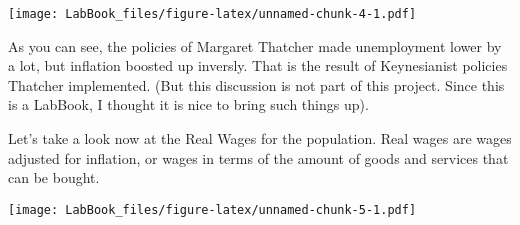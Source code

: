 \documentclass[]{article}
\newenvironment{Shaded}{\begin{snugshade}}{\end{snugshade}}
\newcommand{\KeywordTok}[1]{\textcolor[rgb]{0.13,0.29,0.53}{\textbf{#1}}}
\newcommand{\DataTypeTok}[1]{\textcolor[rgb]{0.13,0.29,0.53}{#1}}
\newcommand{\DecValTok}[1]{\textcolor[rgb]{0.00,0.00,0.81}{#1}}
\newcommand{\StringTok}[1]{\textcolor[rgb]{0.31,0.60,0.02}{#1}}
\newcommand{\OperatorTok}[1]{\textcolor[rgb]{0.81,0.36,0.00}{\textbf{#1}}}
\newcommand{\NormalTok}[1]{#1}
\begin{document}
\texttt{[image: LabBook\_files/figure-latex/unnamed-chunk-4-1.pdf]}

As you can see, the policies of Margaret Thatcher made unemployment
lower by a lot, but inflation boosted up inversly. That is the result of
Keynesianist policies Thatcher implemented. (But this discussion is not
part of this project. Since this is a LabBook, I thought it is nice to
bring such things up).

Let's take a look now at the Real Wages for the population. Real wages
are wages adjusted for inflation, or wages in terms of the amount of
goods and services that can be bought.

\begin{Shaded}
\end{Shaded}

\texttt{[image: LabBook\_files/figure-latex/unnamed-chunk-5-1.pdf]}
\end{document}
